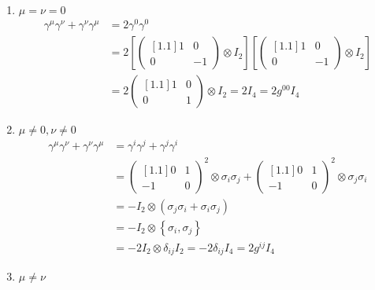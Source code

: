 \begin{solution}
\begin{enumerate}[label=(\alph*)]
    \item  $\mu=\nu=0$
    \begin{align*}
        \gamma^\mu \gamma^\nu + \gamma^\nu \gamma^\mu &= 2 \gamma^0\gamma^0 \\[0.15in]
        &= 2 \left[\begin{pmatrix}[1.1]
            1 & 0 \\
            0 & -1 
        \end{pmatrix} \otimes I_2 \right] \left[\begin{pmatrix}[1.1]
            1 & 0 \\
            0 & -1 
        \end{pmatrix} \otimes I_2 \right] \\[0.15in]
        &= 2 \begin{pmatrix}[1.1]
            1 & 0 \\
            0 & 1 
        \end{pmatrix} \otimes I_2  = 2I_4 = 2g^{00} I_4
    \end{align*}
    \item $\mu\neq0,\nu\neq0$ 
    \begin{align*}
        \gamma^\mu \gamma^\nu + \gamma^\nu \gamma^\mu &= \gamma^i \gamma^j + \gamma^j \gamma^i \\[0.15in]
                                                      &= \begin{pmatrix}[1.1]
                                                        0 & 1 \\
                                                        -1 & 0 
                                                    \end{pmatrix}^2  \otimes \sigma_i\sigma_j + \begin{pmatrix}[1.1]
                                                        0 & 1 \\
                                                        -1 & 0 
                                                    \end{pmatrix}^2  \otimes \sigma_j\sigma_i \\[0.15in]
                                                      &= - I_2 \otimes \left( \sigma_j\sigma_i + \sigma_i\sigma_j \right) \\[0.15in]
                                                      &= - I_2 \otimes \left\{ \sigma_i,\sigma_j \right\} \\[0.15in]
                                                      &= - 2 I_2 \otimes \delta_{ij} I_2 = -2 \delta_{ij}I_4  = 2g^{ij} I_4                                                      
    \end{align*}
    \item $\mu\neq\nu$
    

\end{enumerate}
\end{solution}
